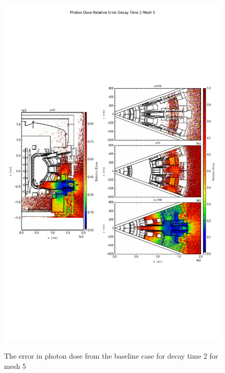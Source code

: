 \begin{figure}[ht!]
\centering
\includegraphics[trim={0cm 9cm 0cm 10cm},clip,scale=0.75]{../plots/final_model/Photon_Dose_Relative_Error_Decay_Time_2_Mesh_5.png}
\label{fig:photons_dc2_no4bc_m5_error}
\caption{The error in photon dose from the baseline case for decay time 2 for mesh 5}
\end{figure}
